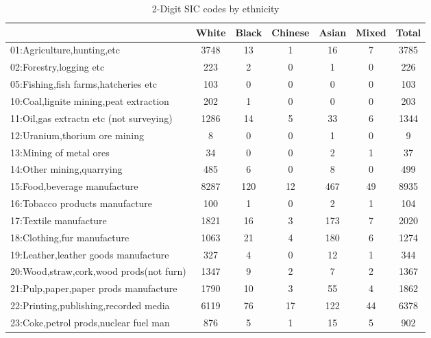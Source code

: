 {
\def\sym#1{\ifmmode^{#1}\else\(^{#1}\)\fi}
\begin{longtable}{l*{6}{c}}
\caption{2-Digit SIC codes by ethnicity}\\
\hline\hline\endfirsthead\hline\endhead\hline\endfoot\endlastfoot
          &    White&    Black&  Chinese&    Asian&    Mixed&    Total\\
\hline
01:Agriculture,hunting,etc&     3748&       13&        1&       16&        7&     3785\\
02:Forestry,logging etc&      223&        2&        0&        1&        0&      226\\
05:Fishing,fish farms,hatcheries etc&      103&        0&        0&        0&        0&      103\\
10:Coal,lignite mining,peat extraction&      202&        1&        0&        0&        0&      203\\
11:Oil,gas extractn etc (not surveying)&     1286&       14&        5&       33&        6&     1344\\
12:Uranium,thorium ore mining&        8&        0&        0&        1&        0&        9\\
13:Mining of metal ores&       34&        0&        0&        2&        1&       37\\
14:Other mining,quarrying&      485&        6&        0&        8&        0&      499\\
15:Food,beverage manufacture&     8287&      120&       12&      467&       49&     8935\\
16:Tobacco products manufacture&      100&        1&        0&        2&        1&      104\\
17:Textile manufacture&     1821&       16&        3&      173&        7&     2020\\
18:Clothing,fur manufacture&     1063&       21&        4&      180&        6&     1274\\
19:Leather,leather goods manufacture&      327&        4&        0&       12&        1&      344\\
20:Wood,straw,cork,wood prods(not furn)&     1347&        9&        2&        7&        2&     1367\\
21:Pulp,paper,paper prods manufacture&     1790&       10&        3&       55&        4&     1862\\
22:Printing,publishing,recorded media&     6119&       76&       17&      122&       44&     6378\\
23:Coke,petrol prods,nuclear fuel man&      876&        5&        1&       15&        5&      902\\

\end{longtable}}
